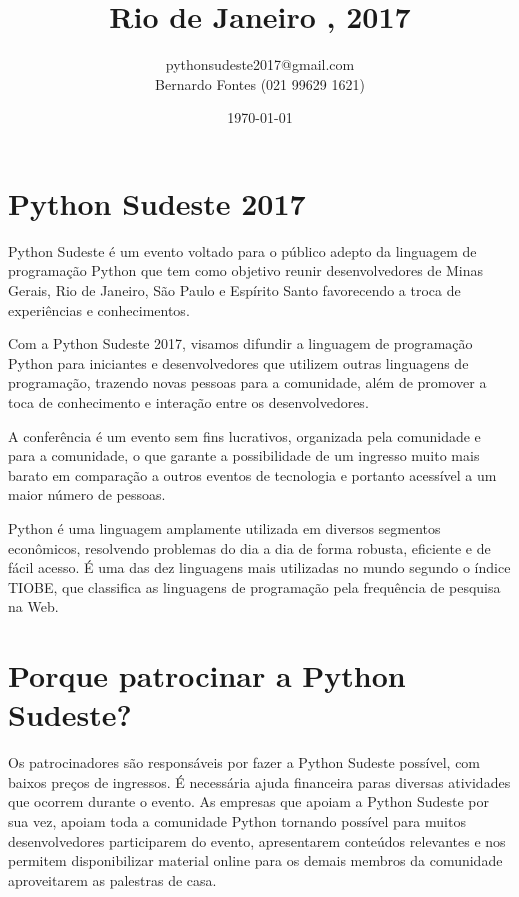 \documentclass[12pt]{article}
\title{Rio de Janeiro , 2017}
\author{pythonsudeste2017@gmail.com \\ Bernardo Fontes (021 99629 1621)}
\date{\today}
\begin{document}
\maketitle


\section{Python Sudeste 2017}

Python Sudeste é um evento voltado para o público adepto da linguagem de programação Python que tem como objetivo reunir desenvolvedores de Minas Gerais, Rio de Janeiro, São Paulo e Espírito Santo favorecendo a troca de experiências e conhecimentos.

Com a Python Sudeste 2017, visamos difundir a linguagem de programação Python para iniciantes e desenvolvedores que utilizem outras linguagens de programação, trazendo novas pessoas para a comunidade, além de promover a toca de conhecimento e interação entre os desenvolvedores.

A conferência é um evento sem fins lucrativos, organizada pela comunidade e para a comunidade, o que garante a possibilidade de um ingresso muito mais barato em comparação a outros eventos de tecnologia e portanto acessível a um maior número de pessoas.

Python é uma linguagem amplamente utilizada em diversos segmentos econômicos, resolvendo problemas do dia a dia de forma robusta, eficiente e de fácil acesso. É uma das dez linguagens mais utilizadas no mundo segundo o índice TIOBE, que classifica as linguagens de programação pela frequência de pesquisa na Web.

\section{Porque patrocinar a Python Sudeste?}

Os patrocinadores são responsáveis por fazer a Python Sudeste possível, com baixos preços de ingressos. É necessária ajuda financeira paras diversas atividades que ocorrem durante o evento. As empresas que apoiam a Python Sudeste por sua vez, apoiam toda a comunidade Python tornando possível para muitos desenvolvedores participarem do evento, apresentarem conteúdos relevantes e nos permitem disponibilizar material online para os demais membros da comunidade aproveitarem as palestras de casa.
\end{document}
